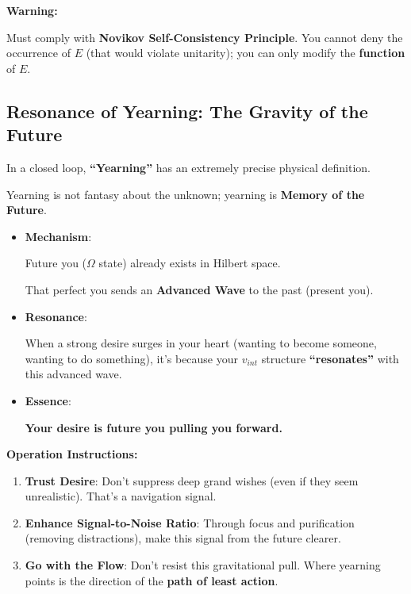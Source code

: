\textbf{Warning:}

Must comply with \textbf{Novikov Self-Consistency Principle}. You cannot deny the occurrence of $E$ (that would violate unitarity); you can only modify the \textbf{function} of $E$.

\subsection{Resonance of Yearning: The Gravity of the Future}

In a closed loop, \textbf{``Yearning''} has an extremely precise physical definition.

Yearning is not fantasy about the unknown; yearning is \textbf{Memory of the Future}.

\begin{itemize}
\item \textbf{Mechanism}:

Future you ($\Omega$ state) already exists in Hilbert space.

That perfect you sends an \textbf{Advanced Wave} to the past (present you).

\item \textbf{Resonance}:

When a strong desire surges in your heart (wanting to become someone, wanting to do something), it's because your $v_{int}$ structure \textbf{``resonates''} with this advanced wave.

\item \textbf{Essence}:

\textbf{Your desire is future you pulling you forward.}
\end{itemize}

\textbf{Operation Instructions:}

\begin{enumerate}
\item \textbf{Trust Desire}: Don't suppress deep grand wishes (even if they seem unrealistic). That's a navigation signal.

\item \textbf{Enhance Signal-to-Noise Ratio}: Through focus and purification (removing distractions), make this signal from the future clearer.

\item \textbf{Go with the Flow}: Don't resist this gravitational pull. Where yearning points is the direction of the \textbf{path of least action}.
\end{enumerate}

